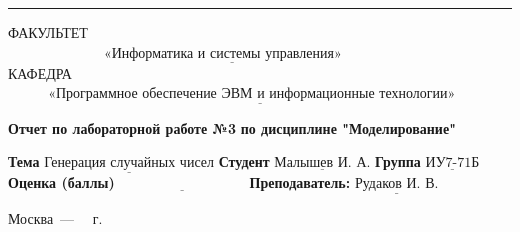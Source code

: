 \documentclass[12pt]{report}
\begin{document}
\begin{titlepage}
		\noindent\rule{18cm}{3pt}
		\newline\newline
		\noindent ФАКУЛЬТЕТ $\underline{~~~~~~~~~~~~~~~~~~~~~~~~~~~~~~~\text{«Информатика и системы управления»}~~~~~~~~~~~~~~~~~~~~~~~~~~~~~~~~~~~~~}$ \newline\newline
		\noindent КАФЕДРА $\underline{~~~~~~~~~~~~~\text{«Программное обеспечение ЭВМ и информационные технологии»}~~~~~~~~~~~~~~~~~~~~~~~}$\newline\newline\newline\newline\newline\newline\newline\newline\newline\newline\newline
		
		
		\begin{center}
			\noindent\begin{minipage}{1.3\textwidth}\centering
				\Large\textbf{  Отчет по лабораторной работе №3}\newline
				\textbf{по дисциплине \newline "Моделирование"}\newline\newline
			\end{minipage}
		\end{center}
		
		\noindent\textbf{Тема} $\underline{\text{Генерация случайных чисел}}$\newline\newline
		\noindent\textbf{Студент} $\underline{\text{Малышев И. А.}}$\newline\newline
		\noindent\textbf{Группа} $\underline{\text{ИУ7-71Б}}$\newline\newline
		\noindent\textbf{Оценка (баллы)} $\underline{\text{~~~~~~~~~~~~~~~~~~~~~~~~~~~}}$\newline\newline
		\noindent\textbf{Преподаватель: } $\underline{\text{Рудаков И. В.}}$\newline\newline\newline
		
		\begin{center}
			\vfill
			Москва~---~\the\year
			~г.
		\end{center}
	\end{titlepage}
	
\end{document}
